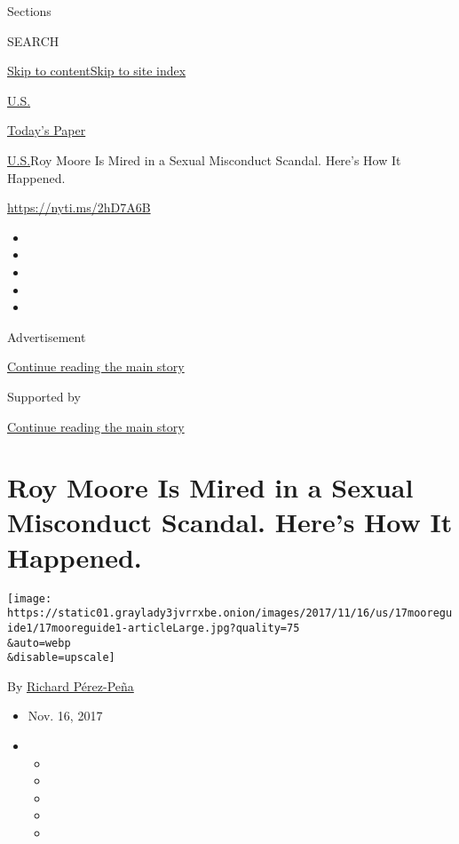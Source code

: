 Sections

SEARCH

\protect\hyperlink{site-content}{Skip to
content}\protect\hyperlink{site-index}{Skip to site index}

\href{https://www.nytimes3xbfgragh.onion/section/us}{U.S.}

\href{https://myaccount.nytimes3xbfgragh.onion/auth/login?response_type=cookie\&client_id=vi}{}

\href{https://www.nytimes3xbfgragh.onion/section/todayspaper}{Today's
Paper}

\href{/section/us}{U.S.}\textbar{}Roy Moore Is Mired in a Sexual
Misconduct Scandal. Here's How It Happened.

\url{https://nyti.ms/2hD7A6B}

\begin{itemize}
\item
\item
\item
\item
\item
\end{itemize}

Advertisement

\protect\hyperlink{after-top}{Continue reading the main story}

Supported by

\protect\hyperlink{after-sponsor}{Continue reading the main story}

\hypertarget{roy-moore-is-mired-in-a-sexual-misconduct-scandal-heres-how-it-happened}{%
\section{Roy Moore Is Mired in a Sexual Misconduct Scandal. Here's How
It
Happened.}\label{roy-moore-is-mired-in-a-sexual-misconduct-scandal-heres-how-it-happened}}

\texttt{[image: https://static01.graylady3jvrrxbe.onion/images/2017/11/16/us/17mooreguide1/17mooreguide1-articleLarge.jpg?quality=75\\\&auto=webp\\\&disable=upscale]}

By
\href{http://www.nytimes3xbfgragh.onion/by/richard-perez-pena}{Richard
Pérez-Peña}

\begin{itemize}
\item
  Nov. 16, 2017
\item
  \begin{itemize}
  \item
  \item
  \item
  \item
  \item
  \end{itemize}
\end{itemize}

